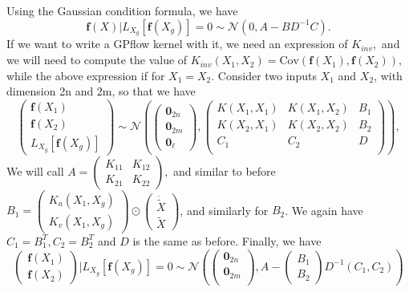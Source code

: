 \documentclass{article}
\begin{document}
Using the Gaussian condition formula, we have
$$
\mathbf{f}(X) | L_{X_g}[\mathbf{f}(X_g)]=0 \sim \mathcal{N} \left(0, A-BD^{-1}C\right).
$$
If we want to write a GPflow kernel with it, 
we need an expression of $K_{inv},$ and we will need to compute the value of $K_{inv}(X_1, X_2)=\mathrm{Cov}(\mathbf{f}(X_1), \mathbf{f}(X_2)),$ while the above expression if for $X_1=X_2.$ 
Consider two inputs $X_1$ and $X_2$, with dimension 2n and 2m, so that we have 
$$
\begin{pmatrix}
  \mathbf{f}(X_1)\\\mathbf{f}(X_2) \\ L_{X_g}[\mathbf{f}(X_g)]
\end{pmatrix}
\sim \mathcal{N}
\left(
\begin{pmatrix}
  \mathbf{0}_{2n} \\ \mathbf{0}_{2m} \\ \mathbf{0}_{\ell}
\end{pmatrix},
\begin{pmatrix}
K(X_1, X_1) & K(X_1, X_2) & B_1 \\
K(X_2, X_1) & K(X_2, X_2) & B_2 \\
C_1         & C_2         & D \\
\end{pmatrix}
\right), 
$$
We will call $A=\begin{pmatrix}
  K_{11} & K_{12} \\ K_{21} & K_{22}
\end{pmatrix},$ and similar to before $B_1=\begin{pmatrix}
  K_a(X_1, X_g) \\ K_v(X_1, X_g) 
\end{pmatrix}\odot\begin{pmatrix}
  \dot{\tilde{X}} \\ \tilde{X}
\end{pmatrix}$, and similarly for $B_2$.
We again have $C_1=B_1^T, C_2=B_2^T$ and $D$ is the same as before.
Finally, we have 
$$
\begin{pmatrix}
  \mathbf{f}(X_1)\\
  \mathbf{f}(X_2)
\end{pmatrix}|L_{X_g}[\mathbf{f}(X_g)]=0
\sim\mathcal{N}
\left(
\begin{pmatrix}
  \mathbf{0}_{2n}\\
  \mathbf{0}_{2m}\\
\end{pmatrix}
,
A-\begin{pmatrix}
  B_1 \\B_2
\end{pmatrix}D^{-1}\left(C_1, C_2\right)
\right)
$$
\end{document}
